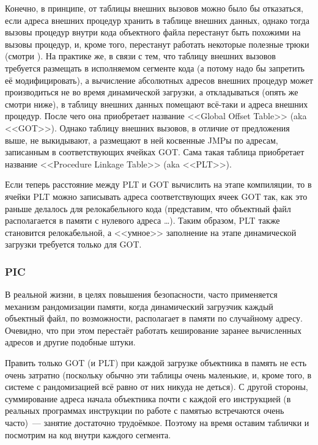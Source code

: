Конечно, в принципе, от таблицы внешних вызовов можно было бы отказаться, если адреса внешних процедур хранить в таблице внешних данных, однако тогда вызовы процедур внутри кода объектного файла перестанут быть похожими на вызовы процедур, и, кроме того, перестанут работать некоторые полезные трюки (смотри ).
На практике же, в связи с тем, что таблицу внешних вызовов требуется размещать в исполняемом сегменте кода (а потому надо бы запретить её модифицировать), а вычисление абсолютных адресов внешних процедур может производиться не во время динамической загрузки, а откладываться (опять же смотри  ниже), в таблицу внешних данных помещают всё-таки и адреса внешних процедур.
После чего она приобретает название <<Global Offset Table>> (aka <<GOT>>).
Однако таблицу внешних вызовов, в отличие от предложения выше, не выкидывают, а размещают в ней косвенные JMPы по адресам, записанным в соответствующих ячейках GOT.
Сама такая таблица приобретает название <<Procedure Linkage Table>> (aka <<PLT>>).

Если теперь расстояние между PLT и GOT вычислить на этапе компиляции, то в ячейки PLT можно записывать адреса соответствующих ячеек GOT так, как это раньше делалось для релокабельного кода (представим, что объектный файл располагается в памяти с нулевого адреса \dots).
Таким образом, PLT также становится релокабельной, а <<умное>> заполнение на этапе динамической загрузки требуется только для GOT.

\subsubsection{PIC}
В реальной жизни, в целях повышения безопасности, часто применяется механизм рандомизации памяти, когда динамический загрузчик каждый объектный файл, по возможности, располагает в памяти по случайному адресу.
Очевидно, что при этом перестаёт работать кеширование заранее вычисленных адресов и другие подобные штуки.

Править только GOT (и PLT) при каждой загрузке объектника в память не есть очень затратно (поскольку обычно эти таблицы очень маленькие, и, кроме того, в системе с рандомизацией всё равно от них никуда не деться).
С другой стороны, суммирование адреса начала объектника почти с каждой его инструкцией (в реальных программах инструкции по работе с памятью встречаются очень часто)~--- занятие достаточно трудоёмкое.
Поэтому на время оставим таблички и посмотрим на код внутри каждого сегмента.

